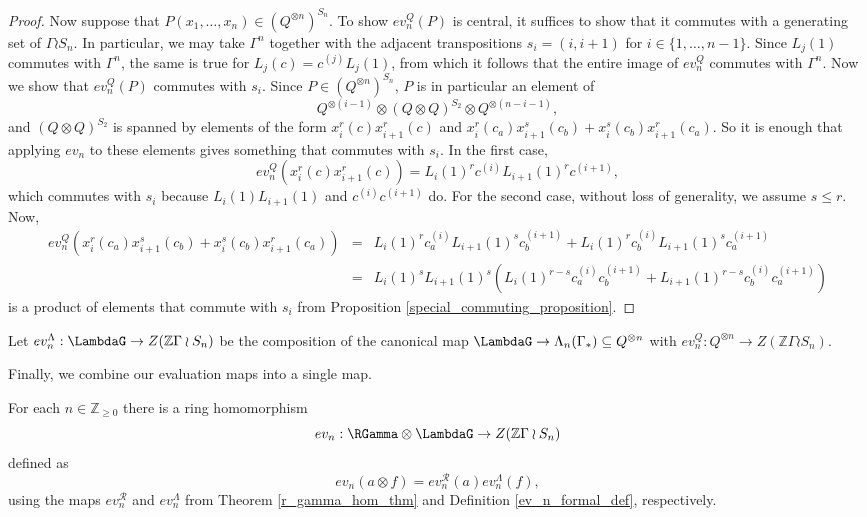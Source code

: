 \begin{proof}
Now suppose that $P(x_1, \ldots, x_n) \in (Q^{\otimes n})^{S_n}$. To show $ev_n^Q(P)$ is central, it suffices to show that it commutes with a generating set of $\Gamma \wr S_n$. In particular, we may take $\Gamma^n$ together with the adjacent transpositions $s_i = (i,i+1)$ for $i \in \{1,\ldots, n-1\}$. Since $L_j(1)$ commutes with $\Gamma^n$, the same is true for $L_j(c) = c^{(j)}L_j(1)$, from which it follows that the entire image of $ev_n^Q$ commutes with $\Gamma^n$. Now we show that $ev_n^Q(P)$ commutes with $s_i$. Since $P \in (Q^{\otimes n})^{S_n}$, $P$ is in particular an element of
\[
Q^{\otimes (i-1)} \otimes (Q \otimes Q)^{S_2} \otimes Q^{\otimes (n-i-1)},
\]
and $(Q \otimes Q)^{S_2}$ is spanned by elements of the form $x_i^r(c) x_{i+1}^r(c)$ and $x_i^r(c_a) x_{i+1}^s(c_b) + x_i^s(c_b) x_{i+1}^r(c_a)$. So it is enough that applying $ev_n$ to these elements gives something that commutes with $s_i$. In the first case,
\[
ev_n^Q(x_i^r(c) x_{i+1}^r(c)) = L_i(1)^r c^{(i)} L_{i+1}(1)^r c^{(i+1)},
\]
which commutes with $s_i$ because $L_i(1) L_{i+1}(1)$ and $c^{(i)}c^{(i+1)}$ do. For the second case, without loss of generality, we assume $s \leq r$. Now,
\scriptsize
\begin{eqnarray*}
ev_n^Q(x_i^r(c_a) x_{i+1}^s(c_b) + x_i^s(c_b) x_{i+1}^r(c_a)) &=& L_i(1)^r c_a^{(i)} L_{i+1}(1)^s c_b^{(i+1)} + L_i(1)^r c_b^{(i)} L_{i+1}(1)^s c_a^{(i+1)}\\
&=& L_i(1)^s L_{i+1}(1)^s \left( L_i(1)^{r-s}c_a^{(i)} c_b^{(i+1)} + L_{i+1}(1)^{r-s}c_b^{(i)} c_a^{(i+1)} \right)
\end{eqnarray*}
\normalsize
is a product of elements that commute with $s_i$ from Proposition \ref{special_commuting_proposition}.
\end{proof}

\begin{definition} \label{ev_n_formal_def}
Let $ev_n^\Lambda: \LambdaG \to Z(\mathbb{Z}\Gamma \wr S_n)$ be the composition of the canonical map $\LambdaG \to \Lambda_n(\Gamma_*) \subseteq Q^{\otimes n}$ with $ev_n^Q: Q^{\otimes n} \to Z(\mathbb{Z}\Gamma \wr S_n)$.
\end{definition}

Finally, we combine our evaluation maps into a single map.
\begin{definition}
For each $n\in \mathbb{Z}_{\geq 0}$ there is a ring homomorphism
\[
ev_n: \RGamma \otimes \LambdaG \to Z(\mathbb{Z}\Gamma \wr S_n)
\]
defined as 
\[
ev_n( a \otimes f) = ev_n^{\mathcal{R}}(a) ev_n^{\Lambda}(f),
\]
using the maps $ev_n^{\mathcal{R}}$ and $ev_n^{\Lambda}$ from Theorem \ref{r_gamma_hom_thm} and Definition \ref{ev_n_formal_def}, respectively.
\end{definition}

